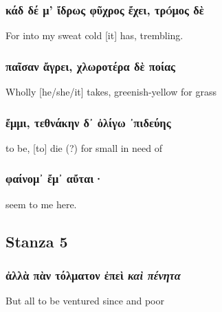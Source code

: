 \subsubsection*{κάδ δέ μ' ἴδρως φῦχρος ἔχει, τρóμος δὲ}
For into my sweat cold [it] has, trembling.

\subsubsection*{παῖσαν ἄγρει, χλωροτέρα δὲ ποίας}
Wholly [he/she/it] takes, greenish-yellow for grass

\subsubsection*{ἔμμι, τεθνάκην δ᾽ ὀλίγω ᾽πιδεύης}
to be, [to] die (?) for small in need of

\subsubsection*{φαίνομ᾽ ἔμ᾽ αὔται·}
seem to me here.

\subsection*{Stanza 5}
\subsubsection*{ἀλλὰ πὰν τόλματον ἐπεὶ \emph{καὶ πένητα}}
But all to be ventured since and poor
